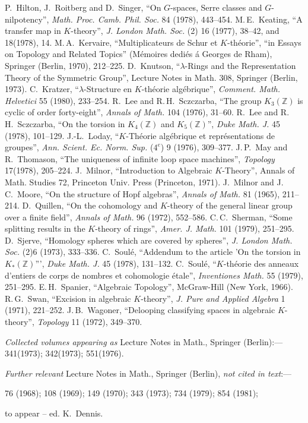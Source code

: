 \documentclass[openany,leqno]{book}  %
\newcommand{\Z}{\mathbb{Z}}
\begin{document}
\begin{thebibliography}{99}
 P.~Hilton, J.~Roitberg and D.~Singer, ``On $G$-spaces, Serre classes and $G$-nilpotency'', {\em Math. Proc. Camb. Phil. Soc.} 84 (1978), 443--454.
 M.\,E.~Keating, ``A transfer map in $K$-theory'', {\em J. London Math. Soc.} (2) 16 (1977), 38--42, and 18(1978), 14.
 M.\,A.~Kervaire, ``Multiplicateurs de Schur et $K$-th\'{e}orie'', ``in Essays on Topology and Related Topics'' (M\'{e}moires dedi\'{e}s \'{a} Georges de Rham), Springer (Berlin, 1970), 212--225.
 D.~Knutson, ``$\lambda$-Rings and the Representation Theory of the Symmetric Group'',
Lecture Notes in Math. 308, Springer (Berlin, 1973).
 C.~Kratzer, ``$\lambda$-Structure en $K$-th\'{e}orie alg\'{e}brique'', {\em Comment. Math. Helvetici} 55 (1980), 233--254.
 R.~Lee and R.\,H.~Sczczarba, ``The group $K_3(\Z)$ is cyclic of order forty-eight'', {\em Annals of Math.} 104 (1976), 31--60.
 R.~Lee and R.\,H.~Sczczarba, ``On the torsion in $K_4(\Z)$ and $K_5(\Z)$'', {\em Duke Math. J.} 45 (1978), 101--129.
 J.-L.~Loday, ``$K$-Th\'{e}orie alg\'{e}brique et repr\'{e}sentations de groupes'', {\em Ann. Scient. Ec. Norm. Sup.} ($4^e$) 9 (1976), 309--377.
 J.\,P.~May and R.~Thomason, ``The uniqueness of infinite loop space machines'', {\em Topology} 17(1978), 205--224.
 J.~Milnor, ``Introduction to Algebraic $K$-Theory'', Annals of Math. Studies 72, Princeton Univ. Press (Princeton, 1971).
 J.~Milnor and J.\,C.~Moore, ``On the structure of Hopf algebras'', {\em Annals of Math.} 81 (1965), 211--214.
 D.~Quillen, ``On the cohomology and $K$-theory of the general linear group over a finite field'', {\em Annals of Math.} 96 (1972), 552--586.
 C.\,C.~Sherman, ``Some splitting results in the $K$-theory of rings'', {\em Amer. J. Math.} 101 (1979), 251--295.
 D.~Sjerve, ``Homology spheres which are covered by spheres'', {\em J. London Math. Soc.} (2)6 (1973), 333--336.
  C.~Soul\'{e}, ``Addendum to the article 'On the torsion in $K_*(\Z)$''', {\em Duke Math. J.} 45 (1978), 131--132.
  C.~Soul\'{e}, ``$K$-th\'{e}orie des anneaux d'entiers de corps de nombres et cohomologie \'{e}tale'', {\em Inventiones Math.} 55 (1979), 251--295.
 E.\,H.~Spanier, ``Algebraic Topology'', McGraw-Hill (New York, 1966).
 R.\,G.~Swan, ``Excision in algebraic $K$-theory'', {\em J. Pure and Applied Algebra} 1 (1971), 221--252.
 J.\,B.~Wagoner, ``Delooping classifying spaces in algebraic $K$-theory'', {\em Topology} 11 (1972), 349--370.

{\em Collected volumes appearing as}  Lecture Notes in Math., Springer (Berlin):---
 341(1973);
 342(1973);
 551(1976).

{\em Further relevant} Lecture Notes in Math., Springer (Berlin), {\em not cited in text}:---

76 (1968); 108 (1969); 149 (1970); 343 (1973); 734 (1979); 854 (1981); 

to appear -- ed. K.~Dennis.
\end{thebibliography} 

\printindex
\end{document}
